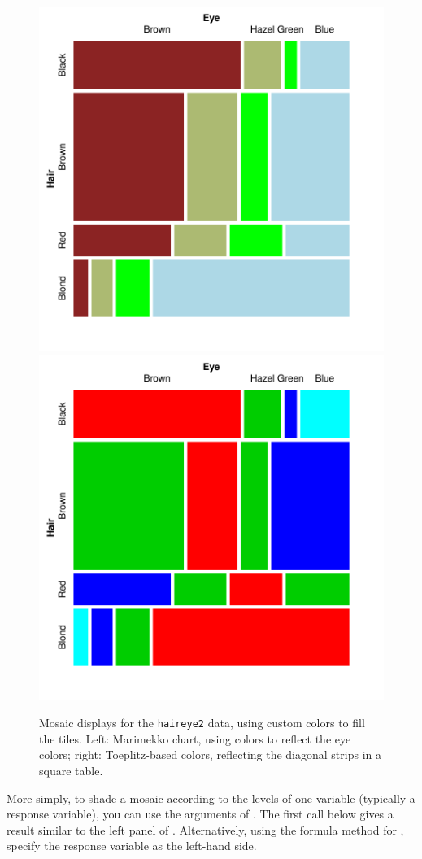 \documentclass[11pt]{book}
\renewenvironment{knitrout}{\small\renewcommand{\baselinestretch}{.85}}{} %
\begin{document}
\begin{figure}
\centering 
\includegraphics[width=.49\textwidth]{ch05/fig/HE-fill1}
\includegraphics[width=.49\textwidth]{ch05/fig/HE-fill2}
\caption{Mosaic displays for the \texttt{haireye2} data, using custom colors to fill the tiles. Left: Marimekko chart, using colors to reflect the eye colors; right: Toeplitz-based colors, reflecting the diagonal strips in a square table.}\label{fig:HE-fill}
\end{figure}

More simply, to shade a mosaic according to the levels of one variable (typically a response variable),
you can use the  arguments of .
The first call below gives a result similar to the left panel of .
Alternatively, using the formula method for , specify the response
variable as the left-hand side.

\begin{knitrout}
\color{fgcolor}\begin{kframe}
\begin{alltt}
 \hlstd{=}\hlstd{,} 
 \hlopt{~}  \hlstd{=}
\end{alltt}
\end{kframe}
\end{knitrout}
\end{document}
